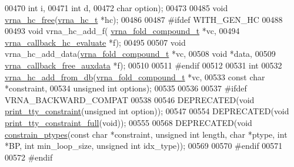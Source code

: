 \begin{DoxyCode}
00470                                 \textcolor{keywordtype}{int} i,
00471                                 \textcolor{keywordtype}{int} d,
00472                                 \textcolor{keywordtype}{char} option);
00473 
00485 \textcolor{keywordtype}{void} \hyperlink{group__hard__constraints_ga696dcf77887d856c6f21ea266d8b9ca2}{vrna\_hc\_free}(\hyperlink{group__hard__constraints_structvrna__hc__s}{vrna\_hc\_t} *hc);
00486 
00487 \textcolor{preprocessor}{#ifdef WITH\_GEN\_HC}
00488 
00493 \textcolor{keywordtype}{void} vrna\_hc\_add\_f( \hyperlink{group__fold__compound_structvrna__fc__s}{vrna\_fold\_compound\_t} *vc,
00494                     \hyperlink{group__hard__constraints_ga16eb71ac9a7a35369be2eaa9d8f8dfa0}{vrna\_callback\_hc\_evaluate} *f);
00495 
00507 \textcolor{keywordtype}{void} vrna\_hc\_add\_data(\hyperlink{group__fold__compound_structvrna__fc__s}{vrna\_fold\_compound\_t} *vc,
00508                       \textcolor{keywordtype}{void} *data,
00509                       \hyperlink{group__fold__compound_ga3ae51bfd5fc3236652d1de4e3274b49b}{vrna\_callback\_free\_auxdata} *f);
00510 
00511 \textcolor{preprocessor}{#endif}
00512 
00531 \textcolor{keywordtype}{int}
00532 \hyperlink{group__hard__constraints_ga5b4de3247b67358080c176b94591a8e6}{vrna\_hc\_add\_from\_db}(\hyperlink{group__fold__compound_structvrna__fc__s}{vrna\_fold\_compound\_t} *vc,
00533                     \textcolor{keyword}{const} \textcolor{keywordtype}{char} *constraint,
00534                     \textcolor{keywordtype}{unsigned} \textcolor{keywordtype}{int} options);
00535 
00536 
00537 \textcolor{preprocessor}{#ifdef  VRNA\_BACKWARD\_COMPAT}
00538 
00546 DEPRECATED(\textcolor{keywordtype}{void} \hyperlink{constraints__hard_8h_a4d167deb70bb51723e44374dc981deb2}{print\_tty\_constraint}(\textcolor{keywordtype}{unsigned} \textcolor{keywordtype}{int} option));
00547 
00554 DEPRECATED(\textcolor{keywordtype}{void} \hyperlink{constraints__hard_8h_ae8ae8a34962b9959be3f6c40f0a80ac1}{print\_tty\_constraint\_full}(\textcolor{keywordtype}{void}));
00555 
00568 DEPRECATED(\textcolor{keywordtype}{void} \hyperlink{constraints__hard_8h_a36c3a6c3218b041f992052767bc74549}{constrain\_ptypes}(\textcolor{keyword}{const} \textcolor{keywordtype}{char} *constraint, \textcolor{keywordtype}{unsigned} \textcolor{keywordtype}{int} length, \textcolor{keywordtype}{char} *ptype, \textcolor{keywordtype}{
      int} *BP, \textcolor{keywordtype}{int} min\_loop\_size, \textcolor{keywordtype}{unsigned} \textcolor{keywordtype}{int} idx\_type));
00569 
00570 \textcolor{preprocessor}{#endif}
00571 
00572 \textcolor{preprocessor}{#endif}
\end{DoxyCode}
